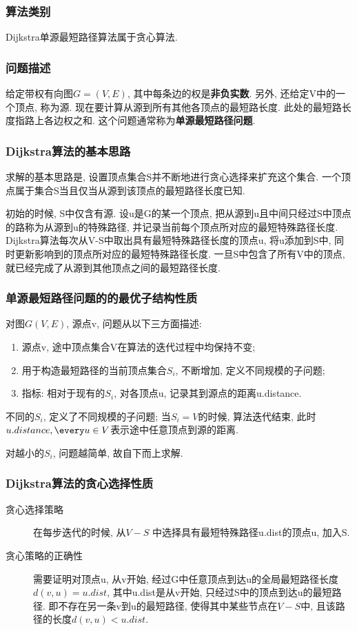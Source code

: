 \subsubsection{算法类别}
Dijkstra单源最短路径算法属于贪心算法.

\subsubsection{问题描述}
给定带权有向图$G=(V,E)$, 其中每条边的权是\textbf{非负实数}. 另外, 还给定V中的一个顶点,
称为源. 现在要计算从源到所有其他各顶点的最短路长度.
此处的最短路长度指路上各边权之和. 这个问题通常称为\textbf{单源最短路径问题}.

\subsubsection{Dijkstra算法的基本思路}
求解的基本思路是, 设置顶点集合S并不断地进行贪心选择来扩充这个集合.
一个顶点属于集合S当且仅当从源到该顶点的最短路径长度已知.\par

初始的时候, S中仅含有源. 设u是G的某一个顶点,
把从源到u且中间只经过S中顶点的路称为从源到u的特殊路径,
并记录当前每个顶点所对应的最短特殊路径长度.
Dijkstra算法每次从V-S中取出具有最短特殊路径长度的顶点u, 将u添加到S中,
同时更新影响到的顶点所对应的最短特殊路径长度. 一旦S中包含了所有V中的顶点,
就已经完成了从源到其他顶点之间的最短路径长度.

\subsubsection{单源最短路径问题的的最优子结构性质}
对图$G(V, E)$, 源点v, 问题从以下三方面描述:
\begin{enumerate}
	\item 源点v, 途中顶点集合V在算法的迭代过程中均保持不变;
	\item 用于构造最短路径的当前顶点集合$S_i$, 不断增加, 定义不同规模的子问题;
	\item 指标: 相对于现有的$S_i$, 对各顶点u, 记录其到源点的距离u.distance.
\end{enumerate}

不同的$S_i$, 定义了不同规模的子问题; 当$S_i = V$的时候, 算法迭代结束,
此时$u.distance, \every u \in V$表示途中任意顶点到源的距离.\par

对越小的$S_i$, 问题越简单, 故自下而上求解.

\subsubsection{Dijkstra算法的贪心选择性质}
\begin{description}
	\item[贪心选择策略] 在每步迭代的时候, 从$V-S$
		中选择具有最短特殊路径u.dist的顶点u, 加入S.
	\item[贪心策略的正确性] 需要证明对顶点u, 从v开始,
		经过G中任意顶点到达u的全局最短路径长度$d(v, u) = u.dist$,
		其中u.dist是从v开始, 只经过S中的顶点到达u的最短路径.
		即不存在另一条v到u的最短路径, 使得其中某些节点在$V-S$中,
		且该路径的长度$d(v, u)< u.dist$.
\end{description}

